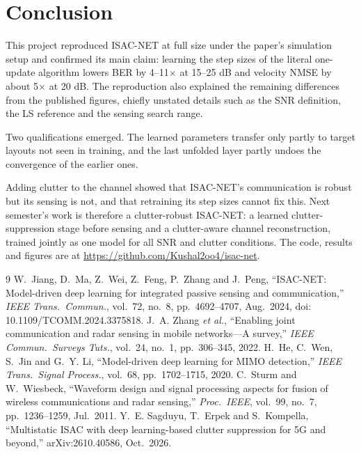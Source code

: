 \documentclass[11pt,a4paper]{article}
\begin{document}
\section{Conclusion}\label{sec:conclusion}
This project reproduced ISAC-NET at full size under the paper's simulation setup and confirmed its main claim: learning the step sizes of the literal one-update algorithm lowers BER by 4--11$\times$ at 15--25 dB and velocity NMSE by about 5$\times$ at 20 dB. The reproduction also explained the remaining differences from the published figures, chiefly unstated details such as the SNR definition, the LS reference and the sensing search range.

Two qualifications emerged. The learned parameters transfer only partly to target layouts not seen in training, and the last unfolded layer partly undoes the convergence of the earlier ones.

Adding clutter to the channel showed that ISAC-NET's communication is robust but its sensing is not, and that retraining its step sizes cannot fix this. Next semester's work is therefore a clutter-robust ISAC-NET: a learned clutter-suppression stage before sensing and a clutter-aware channel reconstruction, trained jointly as one model for all SNR and clutter conditions. The code, results and figures are at \url{https://github.com/Kushal2oo4/isac-net}.

\begin{thebibliography}{9}
 W.~Jiang, D.~Ma, Z.~Wei, Z.~Feng, P.~Zhang and J.~Peng, ``ISAC-NET: Model-driven deep learning for integrated passive sensing and communication,'' \emph{IEEE Trans.\ Commun.}, vol.~72, no.~8, pp.~4692--4707, Aug.~2024, doi: 10.1109/TCOMM.2024.3375818.
 J.~A. Zhang \emph{et al.}, ``Enabling joint communication and radar sensing in mobile networks---A survey,'' \emph{IEEE Commun.\ Surveys Tuts.}, vol.~24, no.~1, pp.~306--345, 2022.
 H.~He, C.~Wen, S.~Jin and G.~Y. Li, ``Model-driven deep learning for MIMO detection,'' \emph{IEEE Trans.\ Signal Process.}, vol.~68, pp.~1702--1715, 2020.
 C.~Sturm and W.~Wiesbeck, ``Waveform design and signal processing aspects for fusion of wireless communications and radar sensing,'' \emph{Proc.\ IEEE}, vol.~99, no.~7, pp.~1236--1259, Jul.~2011.
 Y.~E. Sagduyu, T.~Erpek and S.~Kompella, ``Multistatic ISAC with deep learning-based clutter suppression for 5G and beyond,'' arXiv:2610.40586, Oct.~2026.
\end{thebibliography}
\end{document}
